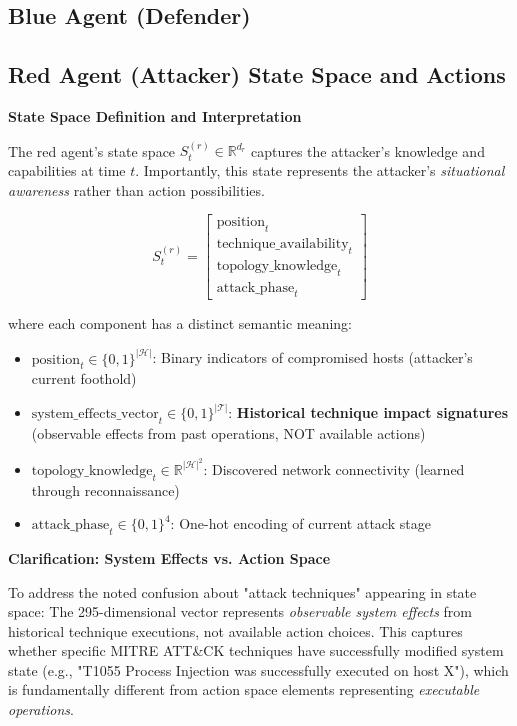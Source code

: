 \documentclass[12pt]{article}
\newcounter{phase}[algorithm]
\theoremstyle{definition}
\theoremstyle{plain}
\begin{document}
\subsection{Blue Agent (Defender)}

\subsection{Red Agent (Attacker) State Space and Actions}

\textbf{State Space Definition and Interpretation}

The red agent's state space $S^{(r)}_t \in \mathbb{R}^{d_r}$ captures the attacker's knowledge and capabilities at time $t$. Importantly, this state represents the attacker's \textit{situational awareness} rather than action possibilities.

\begin{equation}
S^{(r)}_t = \begin{bmatrix}
\text{position}_t \\
\text{technique\_availability}_t \\
\text{topology\_knowledge}_t \\
\text{attack\_phase}_t
\end{bmatrix}
\end{equation}

where each component has a distinct semantic meaning:

\begin{itemize}
    \item $\text{position}_t \in \{0,1\}^{|\mathcal{H}|}$: Binary indicators of compromised hosts (attacker's current foothold)
    \item $\text{system\_effects\_vector}_t \in \{0,1\}^{|\mathcal{T}|}$: \textbf{Historical technique impact signatures} (observable effects from past operations, NOT available actions)
    \item $\text{topology\_knowledge}_t \in \mathbb{R}^{|\mathcal{H}|^2}$: Discovered network connectivity (learned through reconnaissance)
    \item $\text{attack\_phase}_t \in \{0,1\}^4$: One-hot encoding of current attack stage
\end{itemize}

\textbf{Clarification: System Effects vs. Action Space}

To address the noted confusion about "attack techniques" appearing in state space: The 295-dimensional vector represents \textit{observable system effects} from historical technique executions, not available action choices. This captures whether specific MITRE ATT\&CK techniques have successfully modified system state (e.g., "T1055 Process Injection was successfully executed on host X"), which is fundamentally different from action space elements representing \textit{executable operations}.
\end{document}
